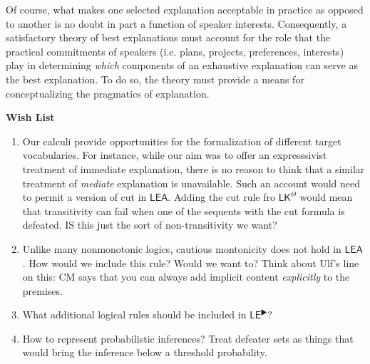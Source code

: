 \documentclass{article}
\theoremstyle{definition}
\theoremstyle{definition}
\theoremstyle{definition}
\theoremstyle{definition}
\theoremstyle{remark}
\theoremstyle{definition}
\theoremstyle{definition}
\begin{document}
 Of course, what makes one selected explanation acceptable in practice as opposed to another is no doubt in part a function of speaker interests. Consequently, a satisfactory theory of best explanations must account for the role that the practical commitments of speakers (i.e. plans, projects, preferences, interests) play in determining \textit{which} components of an exhaustive explanation can serve as the best explanation. To do so, the theory must provide a means for conceptualizing the pragmatics of explanation. 

\textbf{Wish List}
\begin{enumerate}
	\item Our calculi provide opportunities for the formalization of different target vocabularies. For instance, while our aim was to offer an expresssivist treatment of immediate explanation, there is no reason to think that a similar treatment of \textit{mediate} explanation is unavailable. Such an account would need to permit a version of cut in $ \mathsf{LEA} $. Adding the cut rule fro $\mathsf{LK}^\Theta $ would mean that transitivity can fail when one of the sequents with the cut formula is defeated. IS this just the sort of non-transitivity we want?
	\item Unlike many nonmonotonic logics, cautious montonicity does not hold in $ \mathsf{LEA} $. How would we include this rule? Would we want to? Think about Ulf's line on this: CM says that you can always add implicit content \textit{explicitly} to the premises.
	\item What additional logical rules should be included in $ \mathsf{LE}^\RHD $?
	\item How to represent probabilistic inferences? Treat defeater sets as things that would bring the inference below a threshold probability.
\end{enumerate}






 \printbibliography
\end{document}
